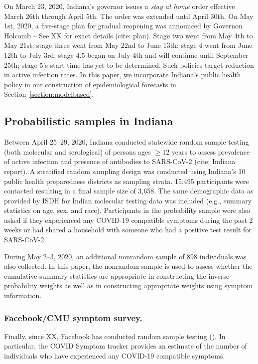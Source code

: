 \documentclass[11pt]{amsart}
\begin{document}
On March 23, 2020, Indiana's governor issues a \emph{stay at home} order effective March 26th through April 5th.  The order was extended until April 30th. On May 1st, 2020, a five-stage plan for gradual reopening was announced by Governon Holcomb -- See XX for exact details (cite: plan).  Stage two went from May 4th to May 21st; stage three went from May 22nd to June 13th; stage 4 went from June 12th to July 3rd; stage 4.5 began on July 4th and will continue until September 25th; stage 5's start time has yet to be determined.  Such  policies target reduction in active infection rates. In this paper, we incorporate Indiana's public health policy in our construction of epidemiological forecasts in Section~\ref{section:modelbased}.


\subsection{Probabilistic samples in Indiana}

Between April 25--29, 2020, Indiana conducted statewide random sample testing (both molecular and serological) of persons ages $\geq 12$ years to assess prevalence of active infection and presence of antibodies to SARS-CoV-2 (cite: Indiana report). A stratified random sampling design was conducted using Indiana’s 10 public health preparedness districts as sampling strata. 15,495 participants were contacted resulting in a final sample size of 3,658. The same demographic data as provided by ISDH for Indian molecular testing data was included (e.g., summary statistics on age, sex, and race). Participants in the probability sample were also asked if they experienced any COVID-19 compatible symptoms during the past 2 weeks or had shared a household with someone who had a positive test result for SARS-CoV-2.

During May 2--3, 2020, an additional nonrandom sample of 898 individuals was also collected.  In this paper, the nonrandom sample is used to assess whether the cumulative summary statistics are appropriate in constructing the inverse-probability weights as well as in constructing appropriate weights using symptom information.

\subsubsection{Facebook/CMU symptom survey.}
Finally, since XX, Facebook has conducted random sample testing ().  In particular, the COVID Symptom tracker provides an estimate of the number of individuals who have experienced any COVID-19 compatible symptoms.
\end{document}
